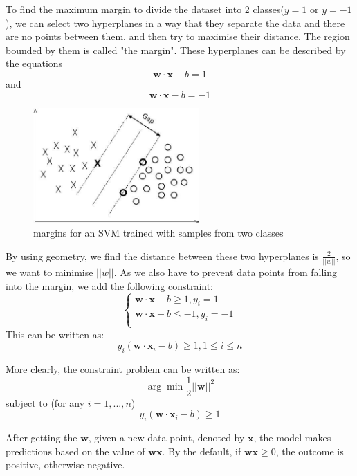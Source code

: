 \documentclass{vldb}
\begin{document}
\par  To find the maximum margin to divide the dataset into 2 classes($y=1$ or $y=-1$), we can select two hyperplanes in a way that they separate the data and there are no points between them, and then try to maximise their distance. The region bounded by them is called "the margin". These hyperplanes can be described by the equations
\begin{displaymath}
\mathbf{w}\cdot\mathbf{x}-b=1
\end{displaymath}
and
\begin{displaymath}
\mathbf{w}\cdot\mathbf{x}-b=-1
\end{displaymath}
\begin{figure}
\begin{center}
\includegraphics[width=2.50in]{SVM.jpeg}
\caption{margins for an SVM trained with samples from two classes}
\end{center}
\end{figure}
\par By using geometry, we find the distance between these two hyperplanes is $\frac{2}{||w||}$, so we want to minimise $||w||$. As we also have to prevent data points from falling into the margin, we add the following constraint:
\begin{displaymath}
\begin{cases}
\mathbf{w}\cdot\mathbf{x}-b\ge1,y_i=1\\
\mathbf{w}\cdot\mathbf{x}-b\le-1,y_i=-1\\
\end{cases}
\end{displaymath}
This can be written as:
\begin{displaymath}
y_i(\mathbf{w}\cdot\mathbf{x}_i-b)\ge1,1\le i \le n
\end{displaymath}
\par More clearly, the constraint problem can be written as:
\begin{displaymath}
\arg\min\frac{1}{2}||\mathbf{w}||^2
\end{displaymath}
subject to (for any $i = 1,...,n$)
\begin{displaymath}
y_i(\mathbf{w}\cdot\mathbf{x}_i-b)\ge1
\end{displaymath}
\par After getting the $\mathbf{w}$, given a new data point, denoted by $\mathbf{x}$, the model makes predictions based on the value of $\mathbf{w}\mathbf{x}$. By the default, if $\mathbf{w}\mathbf{x} \ge 0$, the outcome is positive, otherwise negative. 
\end{document}
